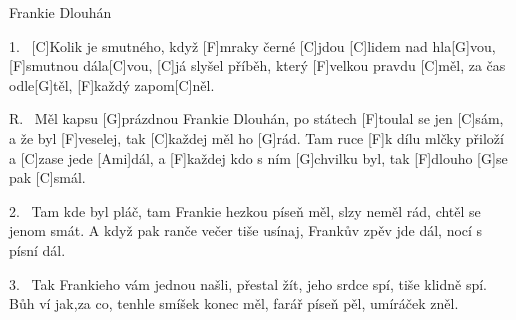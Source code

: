 \begin{song}{Frankie Dlouhán}{}

\begin{xverse}{1.~}
[\large C]Kolik je smutného, když [\large F]mraky černé [\large C]jdou
[\large C]lidem nad hla[\large G]vou, [\large F]smutnou dála[\large C]vou,
[\large C]já slyšel příběh, který [\large F]velkou pravdu [\large C]měl,
za čas odle[\large G]těl, [\large F]každý zapom[\large C]něl.
\end{xverse}

\begin{xverse}{R.~}
Měl kapsu [\large G]prázdnou Frankie Dlouhán,
po státech [\large F]toulal se jen [\large C]sám,
a že byl [\large F]veselej, tak [\large C]každej měl ho [\large G]rád.
Tam ruce [\large F]k dílu mlčky přiloží a [\large C]zase jede [\large Ami]dál,
a [\large F]každej kdo s ním [\large G]chvilku byl,
tak [\large F]dlouho [\large G]se pak [\large C]smál.
\end{xverse}

\begin{xverse}{2.~}
Tam kde byl pláč, tam Frankie hezkou píseň měl,
slzy neměl rád, chtěl se jenom smát.
A když pak ranče večer tiše usínaj,
Frankův zpěv jde dál, nocí s písní dál.
\end{xverse}

\begin{xverse}{3.~}
Tak Frankieho vám jednou našli, přestal žít,
jeho srdce spí, tiše klidně spí.
Bůh ví jak,za co, tenhle smíšek konec měl,
farář píseň pěl, umíráček zněl.
\end{xverse}

\end{song}

